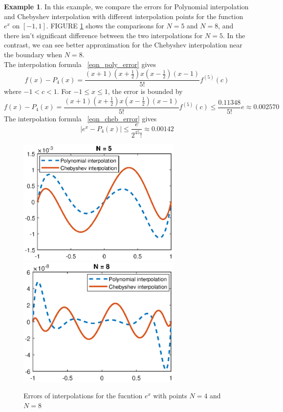 \documentclass[11pt]{amsart}
\theoremstyle{definition}
\newtheorem{exmp}{Example}[section]
\begin{document}
\begin{exmp}
In this example, we compare the errors for Polynomial interpolation and Chebyshev interpolation with different interpolation points for the function $e^x$ on $[-1,1]$. FIGURE \ref{fig:e1} shows the comparisons for $N=5$ and $N=8$, and there isn't significant difference between the two interpolations for $N=5$. In the contrast, we can see better approximation for the Chebyshev interpolation near the boundary when  $N=8$.\\
The interpolation formula ~\eqref{eqn_poly_error} gives 
\begin{equation}
f(x)-P_4(x)=\frac{(x+1)(x+\frac{1}{2})x(x-\frac{1}{2})(x-1)}{5!}f^{(5)}(c)
\end{equation}
where $-1<c<1$. For $-1\leq x\leq 1$, the error is bounded by
\begin{equation*}
f(x)-P_4(x)=\frac{(x+1)(x+\frac{1}{2})x(x-\frac{1}{2})(x-1)}{5!}f^{(5)}(c)\leq \frac{0.11348}{5!}e\approx 0.002570
\end{equation*}
The interpolation formula ~\eqref{eqn_cheb_error} gives 
\begin{equation*}
|e^x-P_4(x)|\leq \frac{e}{2^45!}\approx 0.00142
\end{equation*}

\begin{figure}[H]     	\centerline{\includegraphics[width=3.2in]{./figs/e1a.eps}
      	\hspace{-6pt}
     	\includegraphics[width=3.2in]{./figs/e1b.eps}}
     	\hspace{-6pt}
		\caption{Errors of interpolations for the fucntion $e^x$ with points $N=4$ and $N=8$}
        \label{fig:e1}
\end{figure}
\end{exmp}
\end{document}
